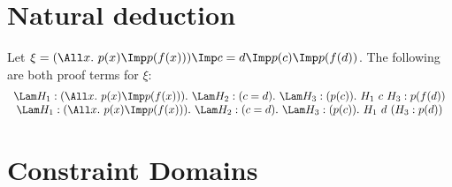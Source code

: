 \section{Natural deduction}



\begin{example}
  Let $\xi=(\All x.~p(x)\Imp p(f(x)))\Imp c=d\Imp p(c)\Imp p(f(d))$.
  The following are both proof terms for $\xi$:
  \[
  \begin{array}{cc}
    \Lam H_1:(\All x.~p(x)\Imp p(f(x))).~
    \Lam H_2:(c=d).~
    \Lam H_3:(p(c)).~
    H_1~c~H_3 : p(f(d))
    \\
    \Lam H_1:(\All x.~p(x)\Imp p(f(x))).~
    \Lam H_2:(c=d).~
    \Lam H_3:(p(c)).~
    H_1~d~(H_3 : p(d))
  \end{array}
  \]
\end{example}

\section{Constraint Domains}

